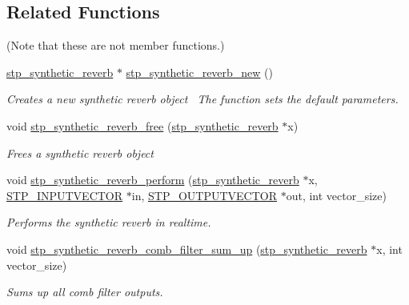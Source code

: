 \subsection*{Related Functions}
(Note that these are not member functions.) \begin{DoxyCompactItemize}
\item 
\hyperlink{structstp__synthetic__reverb}{stp\+\_\+synthetic\+\_\+reverb} $\ast$ \hyperlink{structstp__synthetic__reverb_a8588857ee9bf58eaebcf308980ac1167}{stp\+\_\+synthetic\+\_\+reverb\+\_\+new} ()
\begin{DoxyCompactList}\small\item\em Creates a new synthetic reverb object~\newline
 The function sets the default parameters. ~\newline
 \end{DoxyCompactList}\item 
void \hyperlink{structstp__synthetic__reverb_aeebd2c68f0dc77806a15cf3224acc4ca}{stp\+\_\+synthetic\+\_\+reverb\+\_\+free} (\hyperlink{structstp__synthetic__reverb}{stp\+\_\+synthetic\+\_\+reverb} $\ast$x)
\begin{DoxyCompactList}\small\item\em Frees a synthetic reverb object~\newline
 \end{DoxyCompactList}\item 
void \hyperlink{structstp__synthetic__reverb_af385f69d342da49868fe1c9b8bf0a11a}{stp\+\_\+synthetic\+\_\+reverb\+\_\+perform} (\hyperlink{structstp__synthetic__reverb}{stp\+\_\+synthetic\+\_\+reverb} $\ast$x, \hyperlink{stp__defines_8h_a142134bffa517ce86ebf0bdcdbe975d2}{S\+T\+P\+\_\+\+I\+N\+P\+U\+T\+V\+E\+C\+T\+OR} $\ast$in, \hyperlink{stp__defines_8h_a0a4fde8c3943f5267ab6f09538b3ac26}{S\+T\+P\+\_\+\+O\+U\+T\+P\+U\+T\+V\+E\+C\+T\+OR} $\ast$out, int vector\+\_\+size)
\begin{DoxyCompactList}\small\item\em Performs the synthetic reverb in realtime. ~\newline
 \end{DoxyCompactList}\item 
void \hyperlink{structstp__synthetic__reverb_ac3ac205de199cf3f87ba7618808b034e}{stp\+\_\+synthetic\+\_\+reverb\+\_\+comb\+\_\+filter\+\_\+sum\+\_\+up} (\hyperlink{structstp__synthetic__reverb}{stp\+\_\+synthetic\+\_\+reverb} $\ast$x, int vector\+\_\+size)
\begin{DoxyCompactList}\small\item\em Sums up all comb filter outputs. ~\newline

\end{DoxyCompactList}
\end{DoxyCompactItemize}
